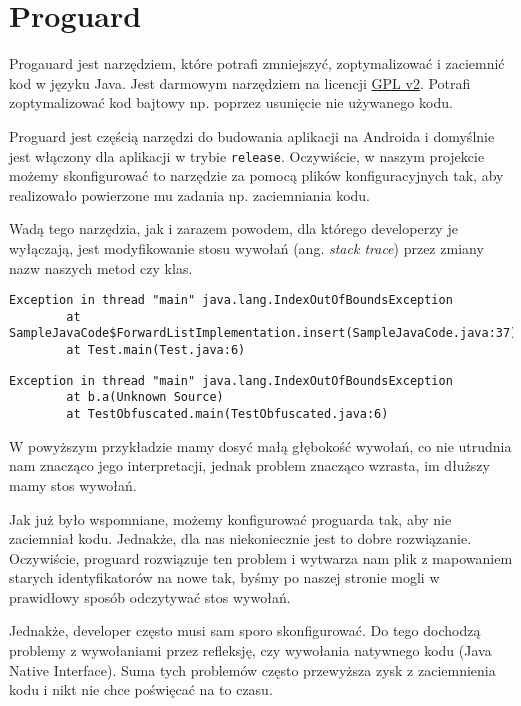 \documentclass[12pt,a4paper,leqno,oneside,titlepage]{book}
\begin{document}
\section{Proguard}
Progauard\cite{Proguard} jest narzędziem, które potrafi zmniejszyć, zoptymalizować i zaciemnić kod w języku Java. Jest darmowym narzędziem na licencji \href{https://en.wikipedia.org/wiki/GNU_General_Public_License#Version_2}{GPL v2}. Potrafi zoptymalizować kod bajtowy np. poprzez usunięcie nie używanego kodu.
\par Proguard jest częścią narzędzi do budowania aplikacji na Androida i domyślnie jest włączony dla aplikacji w trybie \verb|release|. Oczywiście, w naszym projekcie możemy skonfigurować to narzędzie za pomocą plików konfiguracyjnych tak, aby realizowało powierzone mu zadania np. zaciemniania kodu.\par
Wadą tego narzędzia, jak i zarazem powodem, dla którego developerzy je wyłączają, jest modyfikowanie stosu wywołań (ang. \emph{stack trace}) przez zmiany nazw naszych metod czy klas.
%
\begin{lstlisting}[captionpos=b,caption={Przykładowy wyjątek dla nie zaciemnionego kodu.}]
Exception in thread "main" java.lang.IndexOutOfBoundsException
        at SampleJavaCode$ForwardListImplementation.insert(SampleJavaCode.java:37)
        at Test.main(Test.java:6)
\end{lstlisting}
%
\begin{lstlisting}[captionpos=b,caption={Przykładowy wyjątek dla kodu który został zaciemniony.}]
Exception in thread "main" java.lang.IndexOutOfBoundsException
        at b.a(Unknown Source)
        at TestObfuscated.main(TestObfuscated.java:6)
\end{lstlisting}
%
W powyższym przykładzie mamy dosyć małą głębokość wywołań, co nie utrudnia nam znacząco jego interpretacji, jednak problem znacząco wzrasta, im dłuższy mamy stos wywołań.\par
Jak już było wspomniane, możemy konfigurować proguarda tak, aby nie zaciemniał kodu. Jednakże, dla nas niekoniecznie jest to dobre rozwiązanie. Oczywiście, proguard rozwiązuje ten problem i wytwarza nam plik z mapowaniem starych identyfikatorów na nowe tak, byśmy po naszej stronie mogli w prawidłowy sposób odczytywać stos wywołań.
%

%
\par
Jednakże, developer często musi sam sporo skonfigurować. Do tego dochodzą problemy z wywołaniami przez refleksję, czy wywołania natywnego kodu (Java Native Interface). Suma tych problemów często przewyższa zysk z zaciemnienia kodu i nikt nie chce poświęcać na to czasu.
\end{document}
